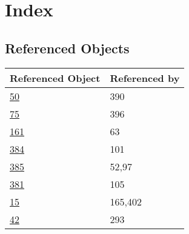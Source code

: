 \documentclass[11pt]{article}
\begin{document}
\section*{Index}
\subsection*{Referenced Objects}
\small
\renewcommand{\arraystretch}{1.2}
\raggedright
\begin{tabular}{|p{3cm}|p{10cm}|}
\hline
\textbf{Referenced Object} & \textbf{Referenced by} \\
\hline
\hyperref[obj-50]{50} & 390  \\
\hyperref[obj-75]{75} & 396  \\
\hyperref[obj-161]{161} & 63  \\
\hyperref[obj-384]{384} & 101  \\
\hyperref[obj-385]{385} & 52,97  \\
\hyperref[obj-381]{381} & 105  \\
\hyperref[obj-15]{15} & 165,402  \\
\hyperref[obj-42]{42} & 293  \\
\hline
\end{tabular}
\end{document}
